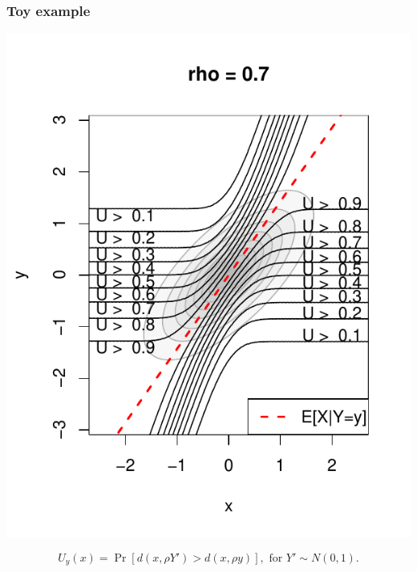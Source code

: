 \documentclass{beamer}
\begin{document}
\begin{frame}
\frametitle{Toy example}
\begin{center}
\includegraphics[scale = 0.5]{../extrapolation/illus_ufunc_0_7.pdf}
\end{center}
\[
U_y(x) = \Pr[d(x, \rho Y') > d(x, \rho y)],\text{ for }Y' \sim N(0,1).
\]
\end{frame}
\end{document}
